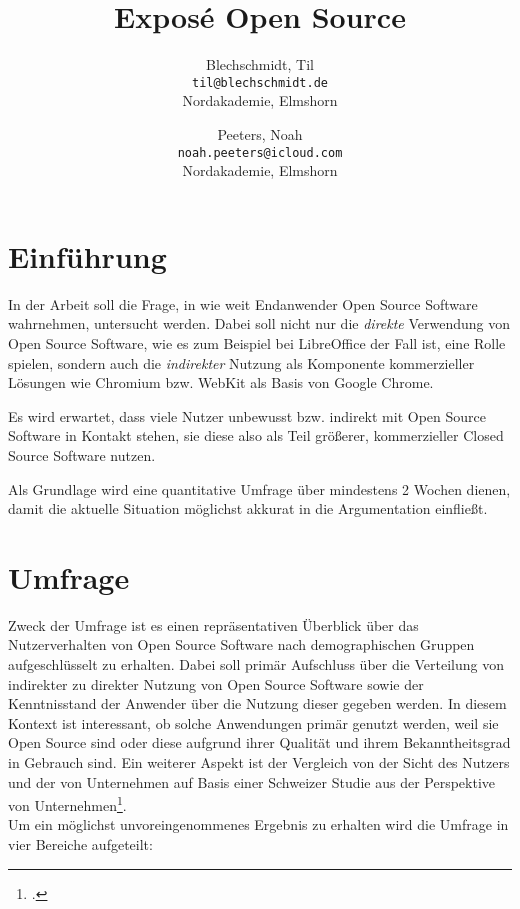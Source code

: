 \documentclass[a4paper]{article}
\title{Exposé Open Source}
\author{
  Blechschmidt, Til\\
  \texttt{til@blechschmidt.de}\\
  Nordakademie, Elmshorn
  \and
  Peeters, Noah\\
  \texttt{noah.peeters@icloud.com}\\
  Nordakademie, Elmshorn
}
\begin{document}
	\maketitle
	
	\section{Einführung}
		
		In der Arbeit soll die Frage, in wie weit Endanwender Open Source Software wahrnehmen, untersucht werden. Dabei soll nicht nur die \emph{direkte} Verwendung von Open Source Software, wie es zum Beispiel bei LibreOffice der Fall ist, eine Rolle spielen, sondern auch die \emph{indirekter} Nutzung als Komponente kommerzieller Lösungen wie Chromium bzw. WebKit als Basis von Google Chrome.
		
		Es wird erwartet, dass viele Nutzer unbewusst bzw. indirekt mit Open Source Software in Kontakt stehen, sie diese also als Teil größerer, kommerzieller Closed Source Software nutzen.
		
		Als Grundlage wird eine quantitative Umfrage über mindestens 2 Wochen dienen, damit die aktuelle Situation möglichst akkurat in die Argumentation einfließt.
	
	\section{Umfrage}
		Zweck der Umfrage ist es einen repräsentativen Überblick über das Nutzerverhalten von Open Source Software nach demographischen Gruppen aufgeschlüsselt zu erhalten. Dabei soll primär Aufschluss über die Verteilung von indirekter zu direkter Nutzung von Open Source Software sowie der Kenntnisstand der Anwender über die Nutzung dieser gegeben werden. In diesem Kontext ist interessant, ob solche Anwendungen primär genutzt werden, weil sie Open Source sind oder diese aufgrund ihrer Qualität und ihrem Bekanntheitsgrad in Gebrauch sind. Ein weiterer Aspekt ist der Vergleich von der Sicht des Nutzers und der von Unternehmen auf Basis einer Schweizer Studie aus der Perspektive von Unternehmen\footcite{oss:studie}.\\
		Um ein möglichst unvoreingenommenes Ergebnis zu erhalten wird die Umfrage in vier Bereiche aufgeteilt:
	   
\end{document}
